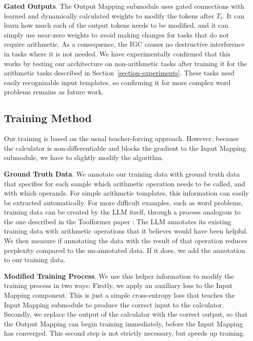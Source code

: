 \documentclass[11pt]{article}
\begin{document}
\textbf{Gated Outputs}.
The Output Mapping submodule uses gated connections with learned and dynamically calculated weights to modify the tokens after $T_t$.
It can learn how much each of the output tokens needs to be modified, and it can simply use near-zero weights to avoid making changes for tasks that do not require arithmetic.
As a consequence, the IGC causes no destructive interference in tasks where it is not needed.
We have experimentally confirmed that this works by testing our architecture on non-arithmetic tasks after training it for the arithmetic tasks described in Section~\ref{section-experiments}.
These tasks used easily recognizable input templates, so confirming it for more complex word problems remains as future work.



\subsection{Training Method}
\label{section-methods-training}


Our training is based on the usual teacher-forcing approach. However, because the calculator is non-differentiable and blocks the gradient to the Input Mapping submodule, we have to slightly modify the algorithm.

\textbf{Ground Truth Data}.
We annotate our training data with ground truth data that specifies for each sample which arithmetic operation needs to be called, and with which operands.
For simple arithmetic templates, this information can easily be extracted automatically.
For more difficult examples, such as word problems, training data can be created by the LLM itself, through a process analogous to the one described in the Toolformer paper \citep{schick2023toolformerlanguagemodelsteach}: The LLM annotates its existing training data with arithmetic operations that it believes would have been helpful. We then measure if annotating the data with the result of that operation reduces perplexity compared to the un-annotated data. If it does, we add the annotation to our training data.

\textbf{Modified Training Process}.
We use this helper information to modify the training process in two ways: Firstly, we apply an auxiliary loss to the Input Mapping component. This is just a simple cross-entropy loss that teaches the Input Mapping submodule to produce the correct input to the calculator. Secondly, we replace the output of the calculator with the correct output, so that the Output Mapping can begin training immediately, before the Input Mapping has converged. This second step is not strictly necessary, but speeds up training.
\end{document}
